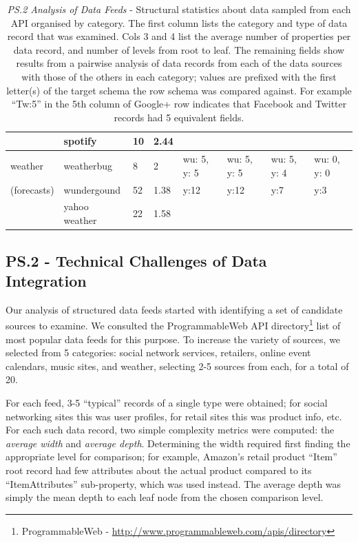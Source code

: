 \documentclass{sigchi}
\begin{document}
\begin{table}
\begin{tabular}{p{2.0cm}  p{1.8cm}  p{1.8cm}  p{1.8cm}  p{1.8cm}  p{1.8cm}  p{1.8cm}  p{1.8cm}}
				& spotify			& 10						& 2.44					&				&						&						& \\
\hline
weather			& weatherbug		& 8						& 2						& wu: 5, y: 5		& wu: 5, y: 5				& wu: 5, y: 4				& wu: 0, y: 0 \\
(forecasts)		& wundergound	& 52						& 1.38					& y:12			& y:12					& y:7						& y:3 \\
				& yahoo weather	& 22						& 1.58					&				&						&						& \\
\end{tabular}
\caption{\emph{PS.2 Analysis of Data Feeds} - Structural statistics about data sampled from each API organised by category.  The first column lists the category and type of data record that was examined.  Cols 3 and 4 list the average number of properties per data record, and number of levels from root to leaf. The remaining fields show results from a pairwise analysis of data records from each of the data sources with those of the others in each category; values are prefixed with the first letter(s) of the target schema the row schema was compared against. For example ``Tw:5'' in the 5th column of Google+ row indicates that Facebook and Twitter records had 5 equivalent fields. }\label{tbl:prestudy2}
\end{table}


\subsection{PS.2 - Technical Challenges of Data Integration}
Our analysis of structured data feeds started with identifying a set of candidate sources to examine.  We consulted the ProgrammableWeb API directory\footnote{ProgrammableWeb - \url{http://www.programmableweb.com/apis/directory}} list of most popular data feeds for this purpose.  To increase the variety of sources, we selected from 5 categories: social network services, retailers, online event calendars, music sites, and weather, selecting 2-5 sources from each, for a total of 20.  

For each feed, 3-5 ``typical'' records of a single type were obtained; for social networking sites this was user profiles, for retail sites this was product info, etc.
For each such data record, two simple complexity metrics were computed: the \emph{average width} and \emph{average depth}.  Determining the width required first finding the appropriate level for comparison; for example, Amazon's retail product ``Item'' root record had few attributes about the actual product compared to its ``ItemAttributes'' sub-property, which was used instead. The average depth was simply the mean depth to each leaf node from the chosen comparison level.
\end{document}
